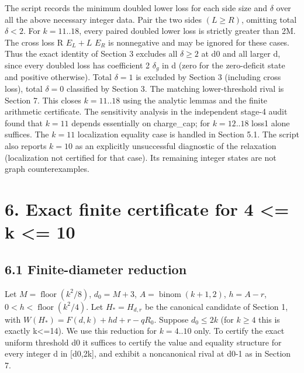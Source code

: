 \documentclass[
  11pt,
]{article}
\begin{document}
The script records the minimum doubled lower loss for each side size and
\(\delta\) over all the above necessary integer data. Pair the two sides
\((L\ge R)\), omitting total \(\delta <2\). For \(k=11..18\), every
paired doubled lower loss is strictly greater than 2M. The cross loss R
\(E_{L}+L\) \(E_{R}\) is nonnegative and may be ignored for these cases.
Thus the exact identity of Section 3 excludes all \(\delta \ge 2\) at d0
and all larger d, since every doubled loss has coefficient 2
\(\delta _{g}\) in d (zero for the zero-deficit state and positive
otherwise). Total \(\delta =1\) is excluded by Section 3 (including
cross loss), total \(\delta =0\) classified by Section 3. The matching
lower-threshold rival is Section 7. This closes \(k=11..18\) using the
analytic lemmas and the finite arithmetic certificate. The sensitivity
analysis in the independent stage-4 audit found that \(k=11\) depends
essentially on charge\_cap; for \(k=12..18\) loss1 alone suffices. The
\(k=11\) localization equality case is handled in Section 5.1. The
script also reports \(k=10\) as an explicitly unsuccessful diagnostic of
the relaxation (localization not certified for that case). Its remaining
integer states are not graph counterexamples.

\section{6. Exact finite certificate for 4 \textless= k \textless=
10}\label{exact-finite-certificate-for-4-k-10}

\subsection{6.1 Finite-diameter
reduction}\label{finite-diameter-reduction}

Let \(M=\operatorname{floor}(k^2/8)\), \(d_0=M+3\),
\(A=\operatorname{binom}(k+1,2)\), \(h=A-r\),
\(0<h<\operatorname{floor}(k^2/4)\). Let \(H_*=H_{d,r}\) be the
canonical candidate of Section 1, with \(W(H_*)=F(d,k)+hd+r-qR_0\).
Suppose \(d_0\le 2k\) (for \(k\ge 4\) this is exactly k\textless=14). We
use this reduction for \(k=4..10\) only. To certify the exact uniform
threshold d0 it suffices to certify the value and equality structure for
every integer d in {[}d0,2k{]}, and exhibit a noncanonical rival at d0-1
as in Section 7.
\end{document}
